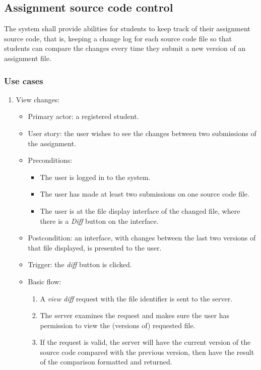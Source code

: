 \subsection{Assignment source code control}
The system shall provide abilities for students to keep track of their
assignment source code, that is, keeping a change log for each source code
file so that students can compare the changes every time they submit a new
version of an assignment file.

\subsubsection{Use cases}
\begin{enumerate}
\item View changes:
\begin{itemize}
    \item Primary actor: a registered student.
    \item User story: the user wishes to see the changes between two
        submissions of the assignment.
    \item Preconditions:
        \begin{itemize}
            \item The user is logged in to the system.
            \item The user has made at least two submissions on one source code
                file.
            \item The user is at the file display interface of the changed file,
                where there is a \emph{Diff} button on the interface.
        \end{itemize}
    \item Postcondition:
        an interface, with changes between the last two versions of that file
        displayed, is presented to the user.
    \item Trigger: the \emph{diff} button is clicked.
    \item Basic flow:
        \begin{enumerate}
            \item A \emph{view diff} request with the file identifier is sent
                to the server.
            \item The server examines the request and makes sure the user has
                permission to view the (versions of) requested file.
            \item If the request is valid, the server will have the current
                version of the source code compared with the previous version,
                then have the result of the comparison formatted and
                returned.
        \end{enumerate}
\end{itemize}
\end{enumerate}

